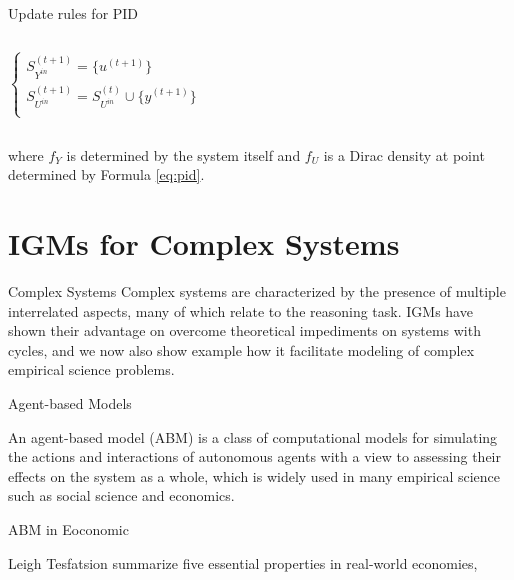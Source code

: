 \documentclass[10pt]{beamer}
\begin{document}
\begin{CJK*}{UTF8}{gbsn}
\begin{frame}{Update rules for PID}
\begin{columns}[T,onlytextwidth]
    \begin{equation*} \label{eq:collect}
    \left\{
     \begin{array}{lr}
     S^{(t+1)}_{Y^{in}} = \{u^{(t+1)}\} \\
     S^{(t+1)}_{U^{in}} = S_{U^{in}}^{(t)} \cup \{y^{(t+1)}\}\\
     \end{array}
    \right.
    \end{equation*}
  \end{columns}
  where $f_Y$ is determined by the system itself and $f_U$ is a Dirac density at point determined by Formula \ref{eq:pid}.
  
  


\end{frame}

\section{IGMs for Complex Systems}

\begin{frame}{Complex Systems}
    Complex systems are characterized by the presence of multiple interrelated aspects, many of which relate to the reasoning task. IGMs have shown their advantage on overcome theoretical impediments on systems with cycles, and we now also show example how it facilitate modeling of complex empirical science problems.
\end{frame}

\begin{frame}{Agent-based Models}

An agent-based model (ABM) is a class of computational models for simulating the actions and interactions of autonomous agents with a view to assessing their effects on the system as a whole, which is widely used in many empirical science such as social science and economics. 

\end{frame}

\begin{frame}{ABM in Eoconomic}

Leigh Tesfatsion summarize five essential properties in real-world economies, 


\end{frame}
\end{CJK*}
\end{document}
